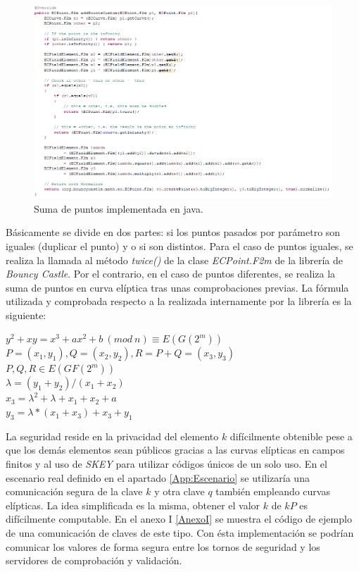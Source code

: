\documentclass[../PFC.tex]{subfiles}
\begin{document}
\begin{figure}[H]
  \centering
  \includegraphics[width=1\textwidth]{./img/addPointsCustom}
  \caption{Suma de puntos implementada en java.}
  \label{img:addPointsCustom}
\end{figure}

Básicamente se divide en dos partes: si los puntos pasados por parámetro son iguales (duplicar el punto) y o si son distintos. Para el caso de puntos iguales, se realiza la llamada al método \textit{twice()} de la clase \textit{ECPoint.F2m} de la librería de \textit{Bouncy Castle}. Por el contrario, en el caso de puntos diferentes, se realiza la suma de puntos en curva elíptica tras unas comprobaciones previas. La fórmula utilizada y comprobada respecto a la realizada internamente por la librería es la siguiente:\\

\begin{center}
$y^2 + xy= x^3 +ax^2 + b\ (mod\ n) \equiv E(G(2^m))$\\
$P=(x_{1},y_{1}), Q=(x_{2},y_{2}), R = P+Q = (x_{3},y_{3})$\\
$P,Q,R\in E(GF(2^m))$\\
$\lambda=(y_{1}+y_{2})/(x_{1}+x_{2})$\\
$x_{3}=\lambda^2+\lambda+x_{1}+x_{2}+a$\\
$y_{3}=\lambda*(x_{1}+x_{3})+x_{3}+y_{1}$\\
\end{center}

La seguridad reside en la privacidad del elemento $k$ difícilmente obtenible pese a que los demás elementos sean públicos gracias a las curvas elípticas en campos finitos y al uso de \textit{SKEY} para utilizar códigos únicos de un solo uso. En el escenario real definido en el apartado \ref{App:Escenario} se utilizaría una comunicación segura de la clave $k$ y otra clave $q$ también empleando curvas elípticas. La idea simplificada es la misma, obtener el valor $k$ de $kP$ es difícilmente computable. En el anexo I \ref{AnexoI} se muestra el código de ejemplo de una comunicación de claves de este tipo. Con ésta implementación se podrían comunicar los valores de forma segura entre los tornos de seguridad y los servidores de comprobación y validación.
\end{document}
